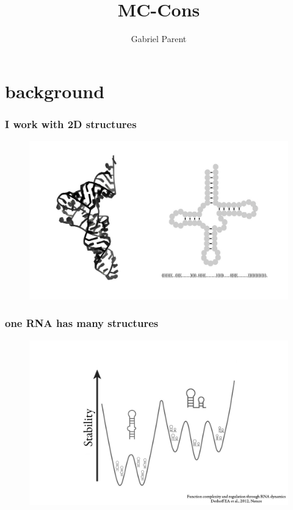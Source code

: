 \documentclass{beamer}
\title{MC-Cons}
\author{Gabriel Parent}
\begin{document}
\maketitle


\section{background}

\begin{frame}
	\frametitle{I work with 2D structures}
	\begin{figure}[!htb]
	\centering
	\includegraphics[scale=0.3]{figs/representations}
	\end{figure} 
\end{frame}



\begin{frame}
	\frametitle{one RNA has many structures}
	\begin{figure}
	\centering
	\includegraphics[scale=1]{figs/dynamics}
	\end{figure}
\end{frame}
\end{document}
